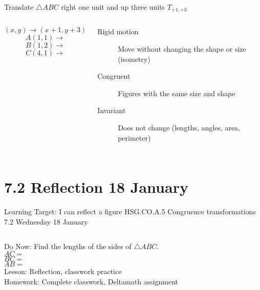 \begin{frame}{Translate $\triangle ABC$ right one unit and up three units $T_{+1,+3}$}
    \begin{columns}
        $$(x,y) \rightarrow (x+1,y+3)$$
        $$A(1,1) \rightarrow$$
        $$B(1,2) \rightarrow$$
        $$C(4,1) \rightarrow$$

        \begin{description}
            \item[Rigid motion] Move without changing the shape or size (isometry)
            \item[Congruent] Figures with the same size and shape
            \item[Invariant] Does not change (lengths, angles, area, perimeter)
          \end{description}
    \begin{flushright}
    \end{flushright}
\end{columns}
\end{frame}

\section{7.2 Reflection \hfill 18 January \,}
\begin{frame}{Learning Target: I can reflect a figure}
  {HSG.CO.A.5 Congruence transformations \hfill \alert{7.2 Wednesday 18 January}}
  \begin{columns}
    Do Now: Find the lengths of the sides of $\triangle ABC$. \\
    $AC=$ \\
    $BC=$ \\
    $AB=$ \\[0.5cm]
    Lesson: Reflection, classwork practice \\
    Homework: Complete classwork, Deltamath assignment
    \begin{flushright}
    \end{flushright}
  \end{columns}
\end{frame}

